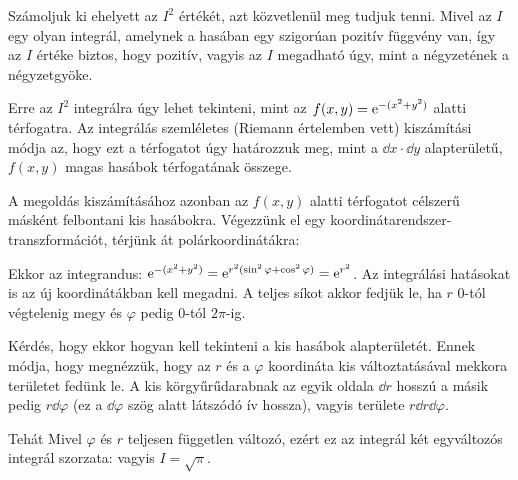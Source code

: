 
\ifdefined\megoldas

 Számoljuk ki ehelyett az $I^2$ értékét, azt közvetlenül meg tudjuk tenni. Mivel az $I$ egy olyan integrál, amelynek a hasában egy szigorúan pozitív függvény van, így az $I$ értéke biztos, hogy pozitív, vagyis az $I$ megadható úgy, mint a négyzetének a négyzetgyöke.
 
 Erre az $I^2$ integrálra úgy lehet tekinteni, mint az $f(x,y)=\mathrm{e}^{-(x^2+y^2)}$ alatti térfogatra. Az integrálás szemléletes (Riemann értelemben vett) kiszámítási módja az, hogy ezt a térfogatot úgy határozzuk meg, mint a $\dd x \cdot \dd y$ alapterületű, $f(x,y)$ magas hasábok térfogatának összege. 
 
 A megoldás kiszámításához azonban az $f(x,y)$ alatti térfogatot célszerű másként felbontani kis hasábokra. Végezzünk el egy koordinátarendszer-transzformációt, térjünk át polárkoordinátákra:
 
 Ekkor az integrandus: $\mathrm{e}^{-(x^2+y^2)}=\mathrm{e}^{r^2(\sin^2\varphi+\cos^2\varphi)}=\mathrm{e}^{r^2}$. Az integrálási hatásokat is az új koordinátákban kell megadni. A teljes síkot akkor fedjük le, ha $r$ $0$-tól végtelenig megy és $\varphi$ pedig $0$-tól $2\pi$-ig.
 
 Kérdés, hogy ekkor hogyan kell tekinteni a kis hasábok alapterületét. Ennek módja, hogy megnézzük, hogy az $r$ és a $\varphi$ koordináta kis változtatásával mekkora területet fedünk le. A kis körgyűrűdarabnak az egyik oldala $\dd r$ hosszú a másik pedig $r\dd \varphi$ (ez a $\dd \varphi$ szög alatt látszódó ív hossza), vagyis területe $r\dd r\dd\varphi$.
 
 Tehát  
 Mivel $\varphi$ és $r$ teljesen független változó, ezért ez az integrál két egyváltozós integrál szorzata:
 vagyis $I=\sqrt{\pi}$.
 
\fi